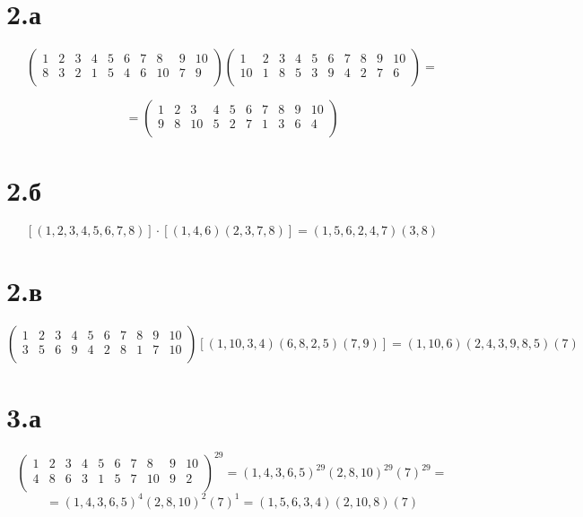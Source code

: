 \documentclass[a4paper]{article}
\begin{document}
\section*{2.а}
\begin{equation*}
\begin{pmatrix}
1 & 2 & 3 & 4 & 5 & 6 & 7 & 8 & 9 & 10\\
8 & 3 & 2 & 1 & 5 & 4 & 6 & 10 & 7 & 9\\\end{pmatrix}
\begin{pmatrix}
1 & 2 & 3 & 4 & 5 & 6 & 7 & 8 & 9 & 10\\
10 & 1 & 8 & 5 & 3 & 9 & 4 & 2 & 7 & 6\\\end{pmatrix}=
\end{equation*}

\begin{equation*}
=
\begin{pmatrix}
1 & 2 & 3 & 4 & 5 & 6 & 7 & 8 & 9 & 10\\
9 & 8 & 10 & 5 & 2 & 7 & 1 & 3 & 6 & 4\\\end{pmatrix}
\end{equation*}


\section*{2.б}
$$[(1, 2, 3, 4, 5, 6, 7, 8)] · [(1, 4, 6)(2, 3, 7, 8)] = (1, 5, 6, 2, 4, 7)(3, 8)$$


\section*{2.в}
\begin{equation*}
\begin{pmatrix}
1 & 2 & 3 & 4 & 5 & 6 & 7 & 8 & 9 & 10\\
3 & 5 & 6 & 9 & 4 & 2 & 8 & 1 & 7 & 10\\
\end{pmatrix}[(1, 10, 3, 4)(6, 8, 2, 5)(7, 9)] = (1, 10, 6)(2, 4, 3, 9, 8, 5)(7)
\end{equation*}


\section*{3.а}
\begin{equation*}
\begin{pmatrix}
1 & 2 & 3 & 4 & 5 & 6 & 7 & 8 & 9 & 10\\
4 & 8 & 6 & 3 & 1 & 5 & 7 & 10 & 9 & 2\\
\end{pmatrix}^{29} = (1, 4, 3, 6, 5)^{29}(2, 8, 10)^{29}(7)^{29}=
\end{equation*}
$$= (1, 4, 3, 6, 5)^{4}(2, 8, 10)^{2}(7)^{1}=
(1, 5, 6, 3, 4)(2, 10, 8)(7)
$$
\end{document}
